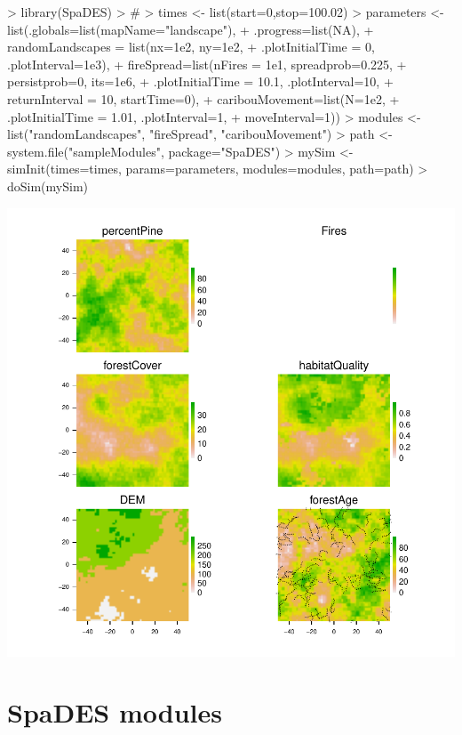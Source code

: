 \documentclass{article}
\begin{document}
\begin{Schunk}
\begin{Sinput}
> library(SpaDES)
> #
> times <- list(start=0,stop=100.02)
> parameters <- list(.globals=list(mapName="landscape"),
+                   .progress=list(NA),
+                   randomLandscapes = list(nx=1e2, ny=1e2,
+                                           .plotInitialTime = 0, .plotInterval=1e3),
+                   fireSpread=list(nFires = 1e1, spreadprob=0.225,
+                                   persistprob=0, its=1e6,
+                                   .plotInitialTime = 10.1, .plotInterval=10,
+                                   returnInterval = 10, startTime=0),
+                   caribouMovement=list(N=1e2,
+                                        .plotInitialTime = 1.01, .plotInterval=1,
+                                        moveInterval=1))
> modules <- list("randomLandscapes", "fireSpread", "caribouMovement")
> path <- system.file("sampleModules", package="SpaDES")
> mySim <- simInit(times=times, params=parameters, modules=modules, path=path)
> doSim(mySim)
\end{Sinput}
\end{Schunk}
\includegraphics{introduction-using-SpaDES}

\newpage

\section{SpaDES modules}
\end{document}
